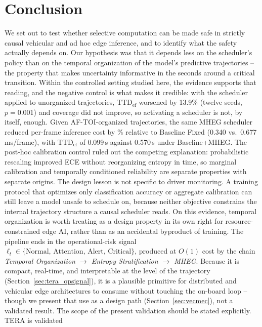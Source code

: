 \documentclass[a4paper,fleqn]{cas-dc}
\newcommand{\MHEG}{\mbox{MHEG}\xspace}
\begin{document}
\section{Conclusion}
\label{sec:conclusao}
We set out to test whether selective computation can be made safe in strictly
causal vehicular and ad hoc edge inference, and to identify what the safety actually
depends on. Our hypothesis was that it depends less on the scheduler's policy than
on the temporal organization of the model's predictive trajectories -- the property
that makes uncertainty informative in the seconds around a critical transition.
Within the controlled setting studied here, the evidence supports that reading, and
the negative control is what makes it credible: with the scheduler applied to
unorganized trajectories, $\mathrm{TTD}_{\mathrm{ef}}$ worsened by
{\color{\revcolor}13.9\% (twelve seeds, $p=0.001$)} and
coverage did not improve, so activating a scheduler is not, by itself, enough.
{\color{\revcolor}Given \mbox{AF-TOI}-organized trajectories, the same \MHEG
scheduler reduced per-frame inference cost by \CostReduction\% relative to
Baseline Fixed (0.340 vs.\ 0.677\,ms/frame), with
$\mathrm{TTD}_{\mathrm{ef}}$ of 0.099\,s against 0.570\,s under
Baseline+MHEG}. The post-hoc calibration control ruled out the competing explanation:
probabilistic rescaling improved ECE without reorganizing entropy in time, so
marginal calibration and temporally conditioned reliability are separate properties
with separate origins.
The design lesson is not specific to driver monitoring. A training protocol that
optimizes only classification accuracy or aggregate calibration can still leave a
model unsafe to schedule on, because neither objective constrains the internal
trajectory structure a causal scheduler reads. On this evidence, temporal
organization is worth treating as a design property in its own right for
resource-constrained edge AI, rather than as an accidental byproduct of training.
The pipeline ends in the operational-risk signal
$\ell_t \in \{\text{Normal},\, \text{Attention},\, \text{Alert},\, \text{Critical}\}$,
produced at $O(1)$ cost by the chain \emph{Temporal Organization $\rightarrow$
Entropy Stratification $\rightarrow$ MHEG}. Because it is compact, real-time, and
interpretable at the level of the trajectory (Section~\ref{sec:tera_opsignal}), it is
a plausible primitive for distributed and vehicular edge architectures to consume
without touching the on-board loop -- though we present that use as a design path
(Section~\ref{sec:vecmec}), not a validated result.
The scope of the present validation should be stated explicitly. TERA is validated
\end{document}
